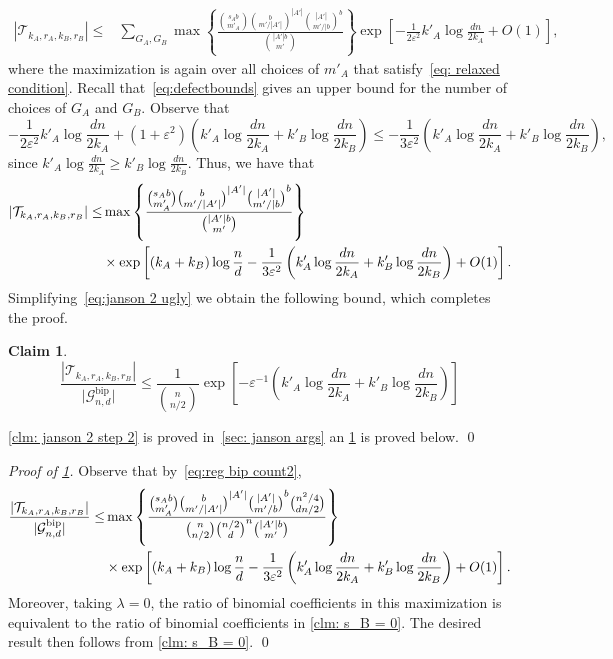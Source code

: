 \documentclass[11pt]{article}
\newcommand{\eps}{\varepsilon}
\theoremstyle{plain}
\newtheorem{claim}{Claim}[thm]
\begin{document}
\begin{align*}
|\mathcal T_{k_A, r_A, k_B, r_B}| \le &\sum_{G_A, G_B}\max\left\{\frac{\binom{s_Ab}{m'_A}\binom{b}{m'/|A'|}^{|A'|}\binom{|A'|}{m'/|b}^{b}}                {\binom{|A'|b}{m'}}\right\} \exp\left[-\frac{1}{2\eps^2}k'_A\log\frac{dn}{2k_A}  + O(1) \right],
\end{align*} 
where the maximization is again over all choices of $m'_A$ that satisfy~\eqref{eq: relaxed condition}. Recall that~\eqref{eq:defectbounds} gives an upper bound for the number of choices of $G_A$ and $G_B$.
Observe that 
\[
-\frac{1}{2\eps^{2}}k'_A\log\frac{dn}{2k_A} + (1 + \eps^2)\left(k'_A\log\frac{dn}{2k_A} + k'_B\log\frac{dn}{2k_B}\right) \leq -\frac{1}{3\eps^2}\left(k'_A\log\frac{dn}{2k_A}+ k'_B\log\frac{dn}{2k_B}\right),
\]
since $k'_A\log\frac{dn}{2k_A} \geq k'_B\log\frac{dn}{2k_B}$. Thus, we have that 
\begin{align}
|\mathcal T_{k_A, r_A, k_B, r_B}| \le &\max\left\{\frac{\binom{s_Ab}{m'_A}\binom{b}{m'/|A'|}^{|A'|}\binom{|A'|}{m'/|b}^{b}}                {\binom{|A'|b}{m'}}\right\}\notag\\& \times\exp\left[(k_A + k_B)\log\frac
n d -\frac{1}{3\eps^2}\left(k'_A\log\frac{dn}{2k_A} + k'_B\log\frac{dn}{2k_B}\right) + O(1) \right].\label{eq:janson 2 ugly}
\end{align} 
Simplifying~\eqref{eq:janson 2 ugly} we obtain the following bound, which completes the proof.

\begin{claim}\label{clm: final counting janson 2}
    \[
        \frac{|\mathcal T_{k_A, r_A, k_B, r_B}|}{\mathcal |\mathcal G_{n,d}^\text{bip}|} \leq\frac{1}{\binom{n}{n/2}}\exp\left[-\eps^{-1}\left(k'_A \log\frac{dn}{2k_A} + k'_B\log\frac{dn}{2k_B}\right)\right]
    \]
\end{claim}
\cref{clm: janson 2 step 2} is proved in~\cref{sec: janson args} an \cref{clm: final counting janson 2} is proved below.
\qed
\medskip
    
    

    \medskip
    \noindent\textit{Proof of \cref{clm: final counting janson 2}.}
    Observe that by~\eqref{eq:reg bip count2}, 
    \begin{align}
        \frac{|\mathcal T_{k_A, r_A, k_B, r_B}|}{|\mathcal G_{n,d}^\text{bip}|} \leq &\max\left\{\frac{\binom{s_Ab}{m'_A}\binom{b}{m'/|A'|}^{|A'|}\binom{|A'|}{m'/b}^{b}\binom{n^2/4}{dn/2}}                {\binom{n}{n/2}\binom{n/2}{d}^n\binom{|A'|b}{m'}}\right\}\notag\\& \times\exp\left[(k_A + k_B)\log\frac
n d -\frac{1}{3\eps^2}\left(k'_A\log\frac{dn}{2k_A} + k'_B\log\frac{dn}{2k_B}\right) + O(1) \right].
    \end{align}
    Moreover, taking $\lambda = 0$, the ratio of binomial coefficients in this maximization is equivalent to the ratio of binomial coefficients in \cref{clm: s_B = 0}. The desired result then follows from \cref{clm: s_B = 0}.
    \qed
\end{document}
